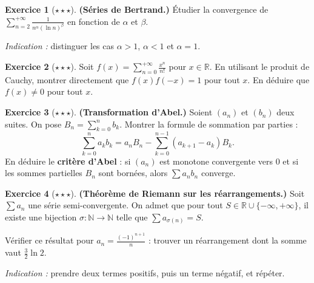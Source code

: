 \documentclass[12pt,a4paper,openany]{book}
\theoremstyle{definition}
\newtheorem{exercice}{Exercice}[chapter]
\newcommand{\N}{\mathbb{N}}
\newcommand{\R}{\mathbb{R}}
\begin{document}
\begin{exercice}[$\star\star\star$]\label{exo:series-bertrand}
  \textbf{(Séries de Bertrand.)} Étudier la convergence de
  $\displaystyle\sum_{n=2}^{+\infty} \frac{1}{n^\alpha (\ln n)^\beta}$
  en fonction de $\alpha$ et $\beta$.

  \textit{Indication :} distinguer les cas $\alpha > 1$, $\alpha < 1$ et $\alpha = 1$.
\end{exercice}

\begin{exercice}[$\star\star\star$]\label{exo:produit-cauchy-exo}
  Soit $f(x) = \sum_{n=0}^{+\infty} \frac{x^n}{n!}$ pour $x \in \R$.
  En utilisant le produit de Cauchy, montrer directement que $f(x)f(-x) = 1$ pour tout $x$.
  En déduire que $f(x) \neq 0$ pour tout $x$.
\end{exercice}

\begin{exercice}[$\star\star\star$]\label{exo:abel}
  \textbf{(Transformation d'Abel.)} Soient $(a_n)$ et $(b_n)$ deux suites. On pose
  $B_n = \sum_{k=0}^{n} b_k$. Montrer la formule de sommation par parties :
  \[
    \sum_{k=0}^{n} a_k b_k = a_n B_n - \sum_{k=0}^{n-1} (a_{k+1} - a_k) B_k.
  \]
  En déduire le \textbf{critère d'Abel} : si $(a_n)$ est monotone convergente vers $0$
  et si les sommes partielles $B_n$ sont bornées, alors $\sum a_n b_n$ converge.
\end{exercice}

\begin{exercice}[$\star\star\star$]\label{exo:rearrangement}
  \textbf{(Théorème de Riemann sur les réarrangements.)}
  Soit $\sum a_n$ une série semi-convergente. On admet que pour tout $S \in \R \cup \{-\infty, +\infty\}$,
  il existe une bijection $\sigma : \N \to \N$ telle que $\sum a_{\sigma(n)} = S$.

  Vérifier ce résultat pour $a_n = \frac{(-1)^{n+1}}{n}$ : trouver un réarrangement
  dont la somme vaut $\frac{3}{2}\ln 2$.

  \textit{Indication :} prendre deux termes positifs, puis un terme négatif, et répéter.
\end{exercice}

\end{document}
